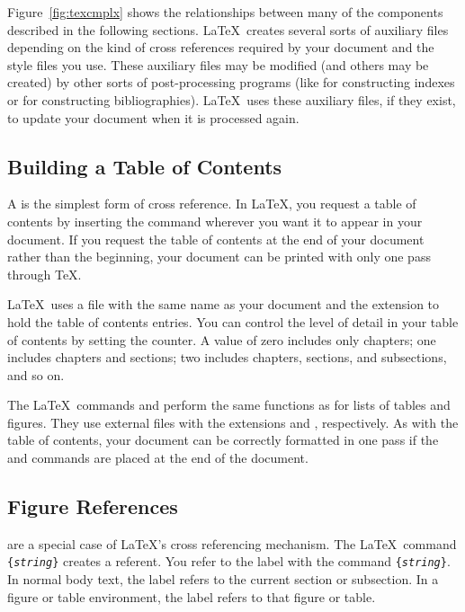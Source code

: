 Figure~\ref{fig:texcmplx} shows the relationships between many of the
components described in the following sections.  \LaTeX\ creates several
sorts of auxiliary files depending on the kind of cross references required
by your document and the style files you use.  These auxiliary files may
be modified (and others may be created) by other sorts of post-processing
programs (like  for 
constructing indexes or 
for constructing bibliographies).   \LaTeX\ uses these auxiliary files,
if they exist, to update your document when it is processed again.


\subsection{Building a Table of Contents}

A  is the simplest form of 
cross reference.  In \LaTeX, you
request a table of contents by 
inserting the  command wherever you want it to 
appear in your document.  If you request the
table of contents at the end of your document rather than the
beginning, your document can be printed with only one pass through \TeX.

\LaTeX\ uses a file with the same name as your document and the extension
 to hold the table of contents entries.  You can control the
level of detail in your table of contents by setting 
the  counter.  A value of zero includes only chapters; one includes
chapters and sections; two includes chapters, sections, and subsections, 
and so on.

The \LaTeX\ 
commands  and
 perform the same functions as
 for lists of tables and figures.  They use
external files with the 
extensions  and
, respectively.  As 
with the table of contents, your
document can be correctly formatted in one pass if the
 and  commands are placed at
the end of the document.

\subsection{Figure References}

 are a 
special case of \LaTeX's cross referencing mechanism.
The \LaTeX\ command \verb|{|\texttt{\textit{string}}\verb|}| 
creates a referent.
You refer to the label with the command
\verb|{|\texttt{\textit{string}}\verb|}|.
In normal body text, the label refers to the current section or subsection.
In a figure or table environment, the label refers to that figure or table.

